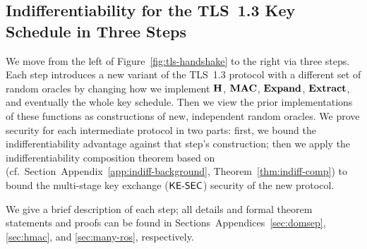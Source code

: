 \subsection{Indifferentiability for the TLS~1.3 Key Schedule in Three Steps}
We move from the left of Figure~\ref{fig:tls-handshake} to the right via three steps.
Each step introduces a new variant of the TLS~1.3 protocol with a different set of random oracles by changing how we implement $\mathbf{H}$, $\mathbf{MAC}$, $\mathbf{Expand}$, $\mathbf{Extract}$, and eventually the whole key schedule.
Then we view the prior implementations of these functions as constructions of new, independent random oracles.
We prove security for each intermediate protocol in two parts: first, we bound the indifferentiability advantage against that step's construction; then we apply the indifferentiability composition theorem based on~\cite{TCC:MauRenHol04}
	(cf.\ \iffull Section~\else Appendix~\fi\ref{app:indiff-background}, Theorem~\ref{thm:indiff-comp})
to bound the multi-stage key exchange ($\mathsf{KE{\text{\normalfont-}}SEC}$) security of the new protocol.

We give a brief description of each step; all details and formal theorem statements and proofs can be found in 
	\iffull Sections~\else Appendices~\fi \ref{sec:domsep}, \ref{sec:hmac}, and \ref{sec:many-ros}, respectively.

